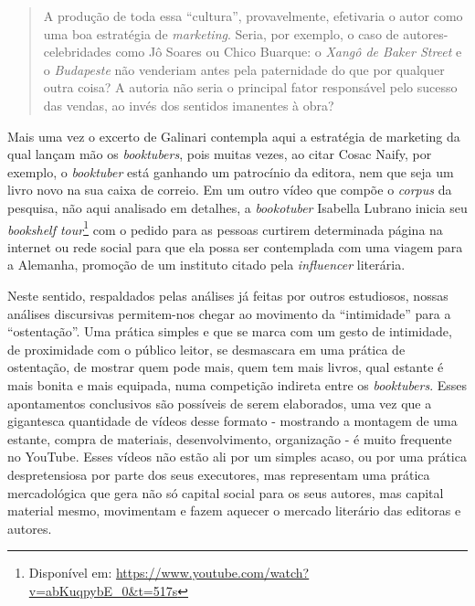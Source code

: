 \begin{quote}
A produção de toda essa \enquote{cultura}, provavelmente, efetivaria o autor
como uma boa estratégia de \textit{marketing}. Seria, por exemplo, o caso
de autores-celebridades como Jô Soares ou Chico Buarque: o \textit{Xangô
de Baker Street} e o \textit{Budapeste} não venderiam antes pela
paternidade do que por qualquer outra coisa? A autoria não seria o
principal fator responsável pelo sucesso das vendas, ao invés dos
sentidos imanentes à obra? \cite[p. 53]{galinari2005autorialidade}
\end{quote}

Mais uma vez o excerto de Galinari contempla aqui a estratégia de
marketing da qual lançam mão os \textit{booktubers}, pois muitas vezes, ao
citar Cosac Naify, por exemplo, o \textit{booktuber} está ganhando um
patrocínio da editora, nem que seja um livro novo na sua caixa de
correio. Em um outro vídeo que compõe o \textit{corpus} da pesquisa, não
aqui analisado em detalhes, a \textit{bookotuber} Isabella Lubrano inicia
seu \textit{bookshelf tour}\footnote{Disponível em:
  \url{https://www.youtube.com/watch?v=abKuqpybE\_0\&t=517s}} com o pedido
para as pessoas curtirem determinada página na internet ou rede social
para que ela possa ser contemplada com uma viagem para a Alemanha,
promoção de um instituto citado pela \textit{influencer} literária.

Neste sentido, respaldados pelas análises já feitas por outros
estudiosos, nossas análises discursivas permitem-nos chegar ao movimento
da \enquote{intimidade} para a \enquote{ostentação}. Uma prática simples e que se marca com um gesto de intimidade, de proximidade com o público leitor,
se desmascara em uma prática de ostentação, de mostrar quem pode mais,
quem tem mais livros, qual estante é mais bonita e mais equipada, numa
competição indireta entre os \textit{booktubers}. Esses apontamentos
conclusivos são possíveis de serem elaborados, uma vez que a gigantesca
quantidade de vídeos desse formato - mostrando a montagem de uma
estante, compra de materiais, desenvolvimento, organização - é muito
frequente no YouTube. Esses vídeos não estão ali por um simples acaso,
ou por uma prática despretensiosa por parte dos seus executores, mas
representam uma prática mercadológica que gera não só capital social
para os seus autores, mas capital material mesmo, movimentam e fazem
aquecer o mercado literário das editoras e autores.

